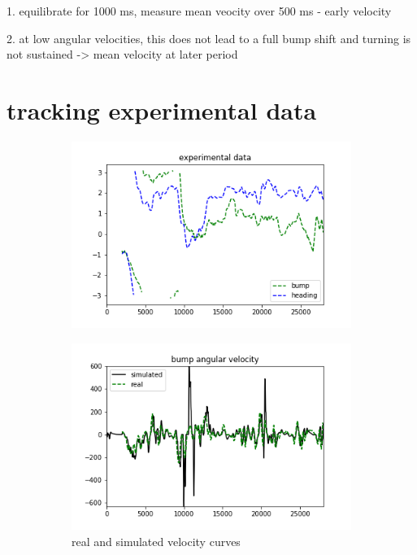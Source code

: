 \documentclass{article}
\begin{document}
1. equilibrate for 1000 ms, measure mean veocity over 500 ms - early velocity

2. at low angular velocities, this does not lead to a full bump shift and turning is not sustained -> mean velocity at later period

\section{tracking experimental data}

\begin{figure}[h]
	\centering
	\begin{subfigure}[t]{0.43\linewidth}
		\centering
		\includegraphics[width = 1.0\linewidth, trim={0 0 0 0}, clip=true]{../figures/real_heading.png}
		\label{fig:F}	
	\end{subfigure}
	\hspace{0.1\linewidth}
	\begin{subfigure}[t]{0.43\linewidth}
		\centering
		\includegraphics[width = 1.0\linewidth, trim={0 0 0 0}, clip=true]{../figures/sim_vel.png}
		\caption{real and simulated velocity curves}
		\label{fig:dF}
	\end{subfigure}
\caption{}
\label{fig:fit}
\end{figure}
\end{document}
